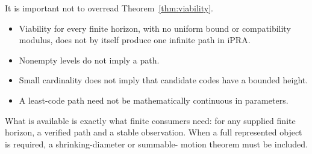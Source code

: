 It is important not to overread Theorem~\ref{thm:viability}.
\begin{itemize}
  \item Viability for every finite horizon, with no uniform bound or compatibility modulus, does not by
        itself produce one infinite path in iPRA.
  \item Nonempty levels do not imply a path.
  \item Small cardinality does not imply that candidate codes have a bounded height.
  \item A least-code path need not be mathematically continuous in parameters.
\end{itemize}
What is available is exactly what finite consumers need: for any supplied finite horizon, a verified path
and a stable observation.  When a full represented object is required, a shrinking-diameter or summable-
motion theorem must be included.
